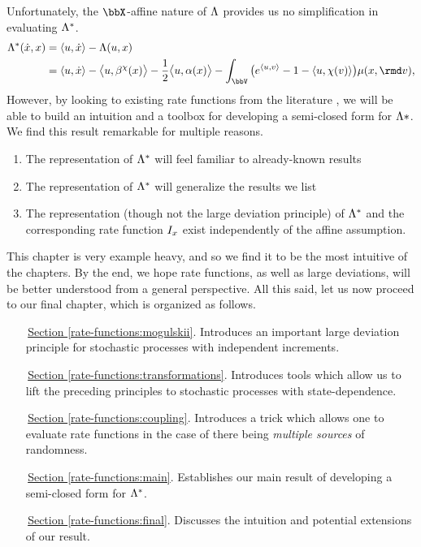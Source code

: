 Unfortunately, the $\stateSpace$-affine nature of $\Lambda$ provides us no simplification in evaluating $\Lambda^*$.
\begin{align*}
  \ode^*(\diffVar, \stateVar) 
  &= \prj{\momentVar}{\diffVar} - \ode(\momentVar, \stateVar)  \\
  &= \prj{\momentVar}{\diffVar} -  \bprj{\momentVar}{\affDrift^\trunc(\stateVar)} - \frac12\bprj{\momentVar}{\affDiff(\stateVar)} - \int_\vecSpace \big( e^\prj{\momentVar}{\markVar} - 1 - \prj{\momentVar}{\trunc(\markVar)} \big) \affJump(\stateVar, \rmd\markVar),
\end{align*}
However, by looking to existing rate functions from the literature \cite{duffy2004,dembo2010,kang2014,gao2018b}, we will be able to build an intuition and a toolbox for developing a semi-closed form for $\Lambda*$.
We find this result remarkable for multiple reasons.
\begin{enumerate}
  \item
    The representation of $\Lambda^*$ will feel familiar to already-known results
  \item
    The representation of $\Lambda^*$ will generalize the results we list
  \item
    The representation (though not the large deviation principle) of $\Lambda^*$ and the corresponding rate function $I_x$ exist independently of the affine assumption.
\end{enumerate}
This chapter is very example heavy, and so we find it to be the most intuitive of the chapters.
By the end, we hope rate functions, as well as large deviations, will be better understood from a general perspective.
All this said, let us now proceed to our final chapter, which is organized as follows.

\begin{enumerate}[leftmargin=24mm]
  \item[\,{\hyperref[rate-functions:mogulskii]{Section }}\ref{rate-functions:mogulskii}.]
    Introduces an important large deviation principle for stochastic processes with independent increments.
  \item[\,{\hyperref[rate-functions:transformations]{Section }}\ref{rate-functions:transformations}.]
    Introduces tools which allow us to lift the preceding principles to stochastic processes with state-dependence.
  \item[\,{\hyperref[rate-functions:coupling]{Section }}\ref{rate-functions:coupling}.]
    Introduces a trick which allows one to evaluate rate functions in the case of there being \emph{multiple sources} of randomness.
  \item[\,{\hyperref[rate-functions:main]{Section }}\ref{rate-functions:main}.]
    Establishes our main result of developing a semi-closed form for $\Lambda^*$.
  \item[\,{\hyperref[rate-functions:final]{Section }}\ref{rate-functions:final}.]
    Discusses the intuition and potential extensions of our result.
\end{enumerate}
